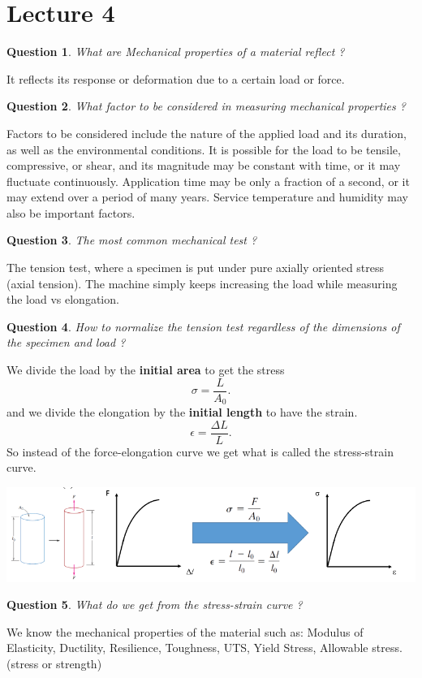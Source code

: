 \documentclass[13]{article}
\newtheorem{exer}{Question}
\begin{document}
\section{Lecture 4}
\begin{exer}
What are Mechanical properties of a material reflect ?
\end{exer}

It reflects its response or deformation due to a certain load or force.
\begin{exer}
What factor to be considered in measuring mechanical properties ?
\end{exer}
Factors to be considered include the nature of the applied load and its
duration, as well as the environmental conditions. It is possible for the
load to be tensile, compressive, or shear, and its magnitude may be constant
with time, or it may fluctuate continuously.  Application time may be only a
fraction of a second, or it may extend over a period of many years. Service
temperature and humidity may also be important factors.
\begin{exer}
The most common mechanical test  ?
\end{exer}
The tension test, where a specimen is put under pure axially oriented stress (axial tension). The machine simply keeps increasing the load while measuring the load vs elongation. 
\begin{exer}
How to normalize the tension test regardless of the dimensions of the specimen and load ?
\end{exer}
We divide the load by the \textbf{initial area}  to get the stress
\[
\sigma = \frac{L}{A_0} 
.\] 
and we divide the elongation by the \textbf{initial length }to have the strain. 
\[
\epsilon = \frac{\Delta L}{L} 
.\] 
So instead of the force-elongation curve we get what is called the stress-strain curve.
\\
\begin{center}
\includegraphics[scale=0.5]{figures/1.png}
\end{center}
\begin{exer}
What do we get from the stress-strain curve ?
\end{exer}
We know the mechanical properties of the material such as: Modulus of Elasticity, Ductility, Resilience, Toughness, UTS, Yield Stress, Allowable stress. (stress or strength)
\end{document}
